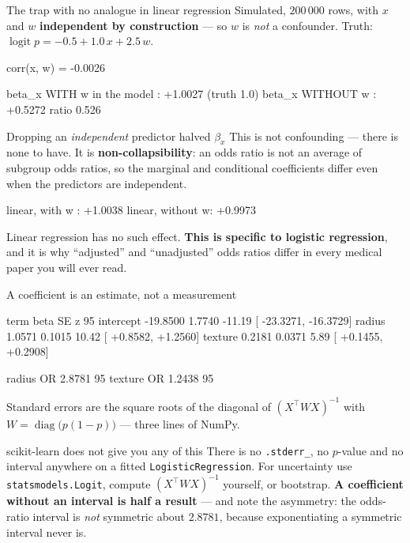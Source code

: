 \documentclass[aspectratio=169]{beamer}
\begin{document}
\begin{frame}[fragile,shrink=8]{The trap with no analogue in linear regression}
Simulated, $200\,000$ rows, with $x$ and $w$ \textbf{independent by
construction} --- so $w$ is \emph{not} a confounder. Truth:
$\operatorname{logit} p = -0.5 + 1.0\,x + 2.5\,w$.
\begin{outblk}
   corr(x, w) = -0.0026

   beta_x WITH w in the model   : +1.0027   (truth 1.0)
   beta_x WITHOUT w             : +0.5272
   ratio 0.526
\end{outblk}
\begin{alertblock}{Dropping an \emph{independent} predictor halved $\beta_x$}
  \footnotesize This is not confounding --- there is none to have. It is
  \textbf{non-collapsibility}: an odds ratio is not an average of subgroup
  odds ratios, so the marginal and conditional coefficients differ even when
  the predictors are independent.
\end{alertblock}
\begin{outblk}
   linear, with w   : +1.0038
   linear, without w: +0.9973
\end{outblk}
\begin{center}\footnotesize
  Linear regression has no such effect. \textbf{This is specific to logistic
  regression}, and it is why ``adjusted'' and ``unadjusted'' odds ratios
  differ in every medical paper you will ever read.
\end{center}
\end{frame}

\begin{frame}[fragile,shrink=8]{A coefficient is an estimate, not a measurement}
\begin{outblk}
term               beta        SE         z        95%
intercept      -19.8500    1.7740    -11.19   [ -23.3271,  -16.3729]
radius           1.0571    0.1015     10.42   [  +0.8582,   +1.2560]
texture          0.2181    0.0371      5.89   [  +0.1455,   +0.2908]

   radius    OR 2.8781   95%
   texture   OR 1.2438   95%
\end{outblk}
Standard errors are the square roots of the diagonal of
$(X^{\!\top} W X)^{-1}$ with $W = \operatorname{diag}\!\big(p(1-p)\big)$ ---
three lines of NumPy.
\begin{alertblock}{scikit-learn does not give you any of this}
  \footnotesize There is no \texttt{.stderr\_}, no $p$-value and no interval
  anywhere on a fitted \texttt{LogisticRegression}. For uncertainty use
  \texttt{statsmodels.Logit}, compute $(X^{\!\top}WX)^{-1}$ yourself, or
  bootstrap. \textbf{A coefficient without an interval is half a result} ---
  and note the asymmetry: the odds-ratio interval is \emph{not} symmetric
  about $2.8781$, because exponentiating a symmetric interval never is.
\end{alertblock}
\end{frame}
\end{document}
